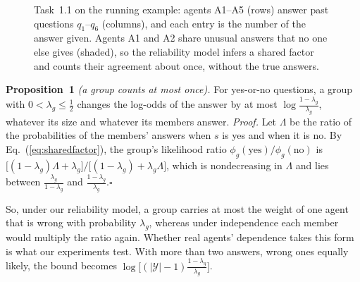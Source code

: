 \documentclass[12pt,letterpaper]{article}
\begin{document}
\begin{figure}
\centering
{}
\caption{Task~1.1 on the running example: agents A1--A5 (rows) answer past questions $q_1$--$q_6$ (columns), and each entry is the number of the answer given. Agents A1 and A2 share unusual answers that no one else gives (shaded), so the reliability model infers a shared factor and counts their agreement about once, without the true answers.}
\label{fig:agree}
\end{figure}
\textbf{Proposition~1} \textit{(a group counts at most once).} For yes-or-no questions, a group with $0<\lambda_g\le\frac12$ changes the log-odds of the answer by at most $\log\frac{1-\lambda_g}{\lambda_g}$, whatever its size and whatever its members answer. \textit{Proof.} Let $\Lambda$ be the ratio of the probabilities of the members' answers when $s$ is yes and when it is no. By Eq.~(\ref{eq:sharedfactor}), the group's likelihood ratio $\phi_g(\text{yes})/\phi_g(\text{no})$ is $\big[(1-\lambda_g)\Lambda+\lambda_g\big]/\big[(1-\lambda_g)+\lambda_g \Lambda\big]$, which is nondecreasing in $\Lambda$ and lies between $\frac{\lambda_g}{1-\lambda_g}$ and $\frac{1-\lambda_g}{\lambda_g}$.\hfill$\square$

So, under our reliability model, a group carries at most the weight of one agent that is wrong with probability $\lambda_g$, whereas under independence each member would multiply the ratio again. Whether real agents' dependence takes this form is what our experiments test. With more than two answers, wrong ones equally likely, the bound becomes $\log\big[(|\mathcal{Y}|-1)\frac{1-\lambda_g}{\lambda_g}\big]$.
\end{document}
